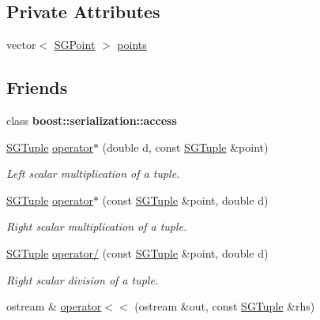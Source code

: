 \subsection*{Private Attributes}
\begin{DoxyCompactItemize}
\item 
vector$<$ \hyperlink{classSGPoint}{S\-G\-Point} $>$ \hyperlink{classSGTuple_a2d9f4a67e7230c46d189eb4472417255}{points}
\end{DoxyCompactItemize}
\subsection*{Friends}
\begin{DoxyCompactItemize}
\item 
\hypertarget{classSGTuple_ac98d07dd8f7b70e16ccb9a01abf56b9c}{class {\bfseries boost\-::serialization\-::access}}\label{classSGTuple_ac98d07dd8f7b70e16ccb9a01abf56b9c}

\item 
\hypertarget{classSGTuple_a774881a3412a621df63ed3454a2923a3}{\hyperlink{classSGTuple}{S\-G\-Tuple} \hyperlink{classSGTuple_a774881a3412a621df63ed3454a2923a3}{operator$\ast$} (double d, const \hyperlink{classSGTuple}{S\-G\-Tuple} \&point)}\label{classSGTuple_a774881a3412a621df63ed3454a2923a3}

\begin{DoxyCompactList}\small\item\em Left scalar multiplication of a tuple. \end{DoxyCompactList}\item 
\hypertarget{classSGTuple_ab4926e79ee6cfcb52928edfee5f7aea6}{\hyperlink{classSGTuple}{S\-G\-Tuple} \hyperlink{classSGTuple_ab4926e79ee6cfcb52928edfee5f7aea6}{operator$\ast$} (const \hyperlink{classSGTuple}{S\-G\-Tuple} \&point, double d)}\label{classSGTuple_ab4926e79ee6cfcb52928edfee5f7aea6}

\begin{DoxyCompactList}\small\item\em Right scalar multiplication of a tuple. \end{DoxyCompactList}\item 
\hypertarget{classSGTuple_a7862330b9a1f30c6d906bdff1fe3af32}{\hyperlink{classSGTuple}{S\-G\-Tuple} \hyperlink{classSGTuple_a7862330b9a1f30c6d906bdff1fe3af32}{operator/} (const \hyperlink{classSGTuple}{S\-G\-Tuple} \&point, double d)}\label{classSGTuple_a7862330b9a1f30c6d906bdff1fe3af32}

\begin{DoxyCompactList}\small\item\em Right scalar division of a tuple. \end{DoxyCompactList}\item 
\hypertarget{classSGTuple_ab3a68f1151e2d11c7eca54a64c9d4a7b}{ostream \& \hyperlink{classSGTuple_ab3a68f1151e2d11c7eca54a64c9d4a7b}{operator$<$$<$} (ostream \&out, const \hyperlink{classSGTuple}{S\-G\-Tuple} \&rhs)}\label{classSGTuple_ab3a68f1151e2d11c7eca54a64c9d4a7b}


\end{DoxyCompactItemize}

